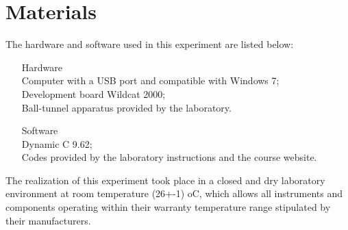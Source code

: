 \section{Materials}

The hardware and software used in this experiment are listed below:

\begin{enumerate}
\item[Hardware]
\\ Computer with a USB port and compatible with Windows 7;
\\ Development board Wildcat 2000;
\\ Ball-tunnel apparatus provided by the laboratory.
\\
\item[Software]
\\ Dynamic C 9.62;
\\ Codes provided by the laboratory instructions and the course website.
\\
\end{enumerate}

The realization of this experiment took place in a closed and dry laboratory environment at room temperature (26+-1)  oC, which allows all instruments and components operating within their warranty temperature range stipulated by their manufacturers.
